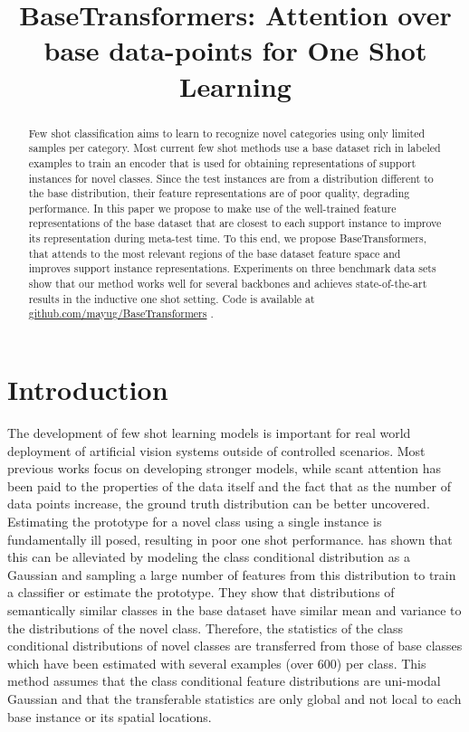 \documentclass{bmvc2k}
\title{BaseTransformers: Attention over base data-points for One Shot Learning}
\begin{document}
\maketitle

\begin{abstract}
Few shot classification aims to learn to recognize novel categories
using only limited samples per category. Most current few shot methods
use a base dataset rich in labeled examples to train an encoder that
is used for obtaining representations of support instances for novel classes. Since
the test instances are from a distribution different to the base
distribution, their feature representations are of poor quality,
degrading  performance. In this paper we propose to make
use of the well-trained feature representations of the base dataset that
are closest to each support instance to improve its representation
during meta-test time. To this end, we propose BaseTransformers, that attends to the most relevant regions of the base dataset
feature space and improves support instance representations. Experiments on three benchmark data
sets show that our method works well for several backbones and
achieves state-of-the-art results in the inductive one shot setting. Code is available at  \href{https://github.com/mayug/BaseTransformers}{github.com/mayug/BaseTransformers} .
\end{abstract}

\section{Introduction}
\label{sec:intro}
 The development of few shot learning models is important for real world deployment of artificial vision systems outside of controlled scenarios. Most previous works focus on developing stronger models, while scant attention has been paid to the properties of the data itself and the fact that as the number of data points increase, the ground truth distribution can be better uncovered. Estimating the prototype for a novel class using a single instance is fundamentally ill posed, resulting in poor one shot performance. \cite{yang2021free} has shown that this can be alleviated by modeling the class conditional distribution as a Gaussian and sampling a large number of features from this distribution to train a classifier or estimate the prototype. They show that distributions of semantically similar classes in the base dataset have similar mean and variance to the distributions of the novel class. Therefore, the statistics of the class conditional distributions of novel classes are transferred from those of base classes which have been estimated with several examples (over 600) per class. This method assumes that the class conditional feature distributions are uni-modal Gaussian and that the transferable statistics are only global and not local to each base instance or its spatial locations. 
\end{document}

